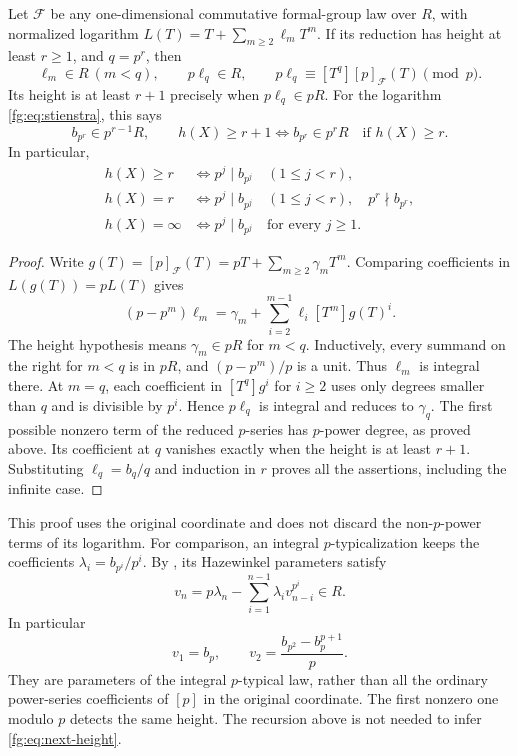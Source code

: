 \begin{lemma}\label{fg:lem:height-log}
Let $\mathcal F$ be any one-dimensional commutative formal-group law
over $R$, with normalized logarithm
$L(T)=T+\sum_{m\ge2}\ell_mT^m$. If its reduction has height at least
$r\ge1$, and $q=p^r$, then
\[
 \ell_m\in R\ (m<q),\qquad p\ell_q\in R,
 \qquad p\ell_q\equiv[T^q][p]_{\mathcal F}(T)\pmod p.
\]
Its height is at least $r+1$ precisely when $p\ell_q\in pR$.
For the logarithm \eqref{fg:eq:stienstra}, this says
\begin{equation}\label{fg:eq:next-height}
 b_{p^r}\in p^{r-1}R,\qquad
 h(X)\ge r+1\iff b_{p^r}\in p^rR
 \quad\text{if }h(X)\ge r.
\end{equation}
In particular,
\begin{align}
 h(X)\ge r&\iff p^j\mid b_{p^j}\quad(1\le j<r),\label{fg:eq:all-height}\\
 h(X)=r&\iff p^j\mid b_{p^j}\quad(1\le j<r),
                  \quad p^r\nmid b_{p^r},\label{fg:eq:exact-height}\\
 h(X)=\infty&\iff p^j\mid b_{p^j}\quad\text{for every }j\ge1.
 \label{fg:eq:infinite-height}
\end{align}
\end{lemma}

\begin{proof}
Write $g(T)=[p]_{\mathcal F}(T)=pT+\sum_{m\ge2}\gamma_mT^m$.
Comparing coefficients in $L(g(T))=pL(T)$ gives
\begin{equation}\label{fg:eq:log-recursion}
 (p-p^m)\ell_m=\gamma_m+
       \sum_{i=2}^{m-1}\ell_i[T^m]g(T)^i.
\end{equation}
The height hypothesis means $\gamma_m\in pR$ for $m<q$.
Inductively, every summand on the right for $m<q$ is in $pR$,
and $(p-p^m)/p$ is a unit. Thus $\ell_m$ is integral there.
At $m=q$, each coefficient in $[T^q]g^i$ for $i\ge2$ uses only
degrees smaller than $q$ and is divisible by $p^i$. Hence
$p\ell_q$ is integral and reduces to $\gamma_q$. The first possible
nonzero term of the reduced $p$-series has $p$-power degree, as proved
above. Its coefficient at $q$ vanishes exactly when the height is at
least $r+1$. Substituting $\ell_q=b_q/q$ and induction in $r$ proves
all the assertions, including the infinite case.
\end{proof}

This proof uses the original coordinate and does not discard the
non-$p$-power terms of its logarithm. For comparison, an integral
$p$-typicalization keeps the coefficients
$\lambda_i=b_{p^i}/p^i$. By
\citet[Theorem~2.8 and (4.3.1), pp.~134,138]{fg-hazewinkel},
its Hazewinkel parameters satisfy
\[
 v_n=p\lambda_n-\sum_{i=1}^{n-1}\lambda_i v_{n-i}^{p^i}\in R.
\]
In particular
\[
 v_1=b_p,\qquad v_2=\frac{b_{p^2}-b_p^{p+1}}p.
\]
They are parameters of the integral $p$-typical law, rather than all the
ordinary power-series coefficients of $[p]$ in the original coordinate.
The first nonzero one modulo $p$ detects the same height. The recursion
above is not needed to infer \eqref{fg:eq:next-height}.

